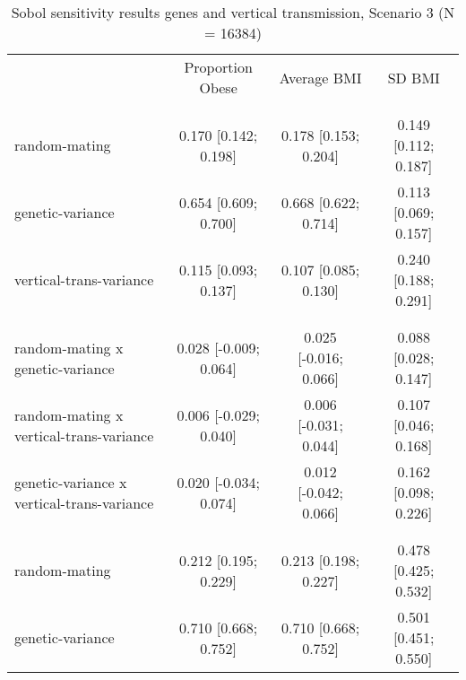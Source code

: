 
\begin{table}[htp]
\renewcommand{\arraystretch}{1.3}
\setlength{\tabcolsep}{5pt}
\caption{Sobol sensitivity results genes and vertical transmission, Scenario 3 (N = 16384)}
\label{tab:sobol}
\footnotesize
\centering
\begin{threeparttable}
\begin{tabular}{lccc}
\hline
\addlinespace
& Proportion Obese & Average BMI & SD BMI \\
\addlinespace
\hline
\addlinespace
\multicolumn{4}{l}{\textbf{Scenario 3 (genes and vertical transmission)}} \\
\addlinespace[6pt]
\multicolumn{4}{l}{\hspace{1em} S1} \\
\hspace{1.5em} random-mating & 0.170 [0.142; 0.198]   & 0.178 [0.153; 0.204]   & 0.149 [0.112; 0.187] \\
	  \hspace{1.5em} genetic-variance & 0.654 [0.609; 0.700]   & 0.668 [0.622; 0.714]   & 0.113 [0.069; 0.157] \\
	  \hspace{1.5em} vertical-trans-variance & 0.115 [0.093; 0.137]   & 0.107 [0.085; 0.130]   & 0.240 [0.188; 0.291] \\
	 \\
\addlinespace[12pt]
\multicolumn{4}{l}{\hspace{1em} S2} \\ 
\hspace{1.5em} random-mating x genetic-variance & 0.028 [-0.009; 0.064]   & 0.025 [-0.016; 0.066]   & 0.088 [0.028; 0.147] \\
	  \hspace{1.5em} random-mating x vertical-trans-variance & 0.006 [-0.029; 0.040]   & 0.006 [-0.031; 0.044]   & 0.107 [0.046; 0.168] \\
	  \hspace{1.5em} genetic-variance x vertical-trans-variance & 0.020 [-0.034; 0.074]   & 0.012 [-0.042; 0.066]   & 0.162 [0.098; 0.226] \\
	 \\
\addlinespace[12pt]
\multicolumn{4}{l}{\hspace{1em} ST} \\ 
\hspace{1.5em} random-mating & 0.212 [0.195; 0.229]   & 0.213 [0.198; 0.227]   & 0.478 [0.425; 0.532] \\
	  \hspace{1.5em} genetic-variance & 0.710 [0.668; 0.752]   & 0.710 [0.668; 0.752]   & 0.501 [0.451; 0.550] \\

\end{tabular}
\end{threeparttable}
\end{table}
